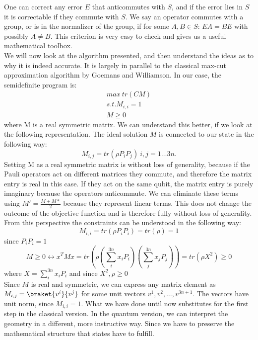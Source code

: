 One can correct any error $E$ that anticommutes with $S$, and if the error lies in $S$ it is correctable if they commute with $S$.\cite{gottesman97}
We say an operator commutes with a group, or is in the normalizer of the group, if for some $A,B\in S$: $EA=BE$ with possibly $A\neq B$.
This criterion is very easy to check and gives us a useful mathematical toolbox. \\
We will now look at the algorithm presented, and then understand the ideas as to why it is indeed accurate.
It is largely in parallel to the classical max-cut approximation algorithm by Goemans and Williamson.
In our case, the semidefinite program is:
\begin{align*}
max ~ tr\left( CM \right)\\
s.t. M_{i,i} = 1 \\
M \ge 0
\end{align*}
where M is a real symmetric matrix.
We can understand this better, if we look at the following representation.
The ideal solution $M$ is connected to our state in the following way:\cite{gharibian19}\[
	M_{i,j} = tr\left( \rho P_{i}P_j \right) ~ i,j=1\ldots 3n
.\]
Setting M as a real symmetric matrix is without loss of generality, because if the Pauli operators act on different matrices they commute, and therefore the matrix entry is real in this case.
If they act on the same qubit, the matrix entry is purely imaginary because the operators anticommute.
We can eliminate these terms using $M'=\frac{M+M*}{2}$ because they represent linear terms.
This does not change the outcome of the objective function and is therefore fully without loss of generality.
From this perspective the constraints can be understood in the following way:
$$M_{i,i}=tr\left( \rho P_i P_i\right) = tr\left( \rho\right) = 1  $$ since $P_iP_i=1$
$$M\ge 0\leftrightarrow x^TMx=tr\left(\rho\left(\sum_{i}^{3n} x_iP_i\right)\left(\sum_{j}^{3n} x_jP_j\right)\right)=tr\left(\rho X^2\right)\ge 0$$ where $X=\sum_{i}^{3n} x_iP_i$ and since $X^2,\rho\ge 0$
 \\
Since $M$ is real and symmetric, we can express any matrix element as $M_{i,j}=\braket{v^i}{v^j}$ for some unit vectors $v^1, v^2,\ldots, v^{3n+1}$.
The vectors have unit norm, since $M_{i,i}=1$.
What we have done until now substitutes for the first step in the classical version.
In the quantum version, we can interpret the geometry in a different, more instructive way.
Since we have to preserve the mathematical structure that states have to fulfill.
